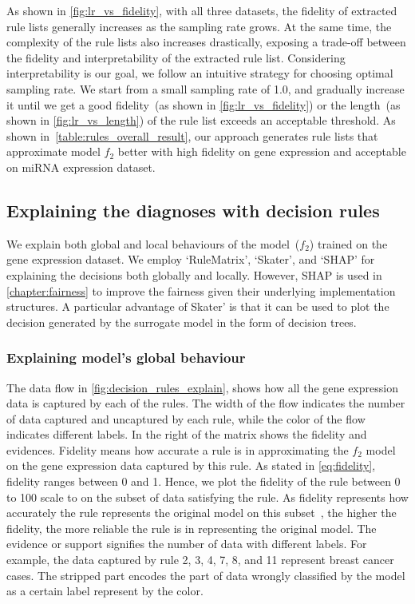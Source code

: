 \hspace*{3.5mm} As shown in \cref{fig:lr_vs_fidelity}, with all three datasets, the fidelity of extracted rule lists generally increases as the sampling rate grows. At the same time, the complexity of the rule lists also increases drastically, exposing a trade-off between the fidelity and interpretability of the extracted rule list. Considering interpretability is our goal, we follow an intuitive strategy for choosing optimal sampling rate. We  start from a small sampling rate of 1.0, and gradually increase it until we get a good fidelity~(as shown in \cref{fig:lr_vs_fidelity}) or the length~(as shown in \cref{fig:lr_vs_length}) of the rule list exceeds an acceptable threshold. As shown in~\cref{table:rules_overall_result}, our approach generates rule lists that approximate model $f_2$ better with high fidelity on gene expression and acceptable on miRNA expression dataset. 

\subsection{Explaining the diagnoses with decision rules}
We explain both global and local behaviours of the model~($f_2$) trained on the gene expression dataset. We employ `RuleMatrix', `Skater', and `SHAP' for explaining the decisions both globally and locally. However, SHAP is used in \cref{chapter:fairness} to improve the fairness given their underlying implementation structures. A particular advantage of Skater' is that it can be used to plot the decision generated by the surrogate model in the form of decision trees. 

\subsubsection{Explaining model's global behaviour}
The data flow in \cref{fig:decision_rules_explain}, shows how all the gene expression data is captured by each of the rules. The width of the flow indicates the number of data captured and uncaptured by each rule, while the color of the flow indicates different labels. In the right of the matrix shows the fidelity and evidences. Fidelity means how accurate a rule is in approximating the $f_2$ model on the gene expression data captured by this rule. 
As stated in \cref{eq:fidelity}, fidelity ranges between 0 and 1. Hence, we plot the fidelity of the rule between 0 to 100 scale to on the subset of data satisfying the rule. As fidelity represents how accurately the rule represents the original model on this subset~\cite{ming2018rulematrix}, the higher the fidelity, the more reliable the rule is in representing the original model. The evidence or support signifies the number of data with different labels. For example, the data captured by rule 2, 3, 4, 7, 8, and 11 represent breast cancer cases. The stripped part encodes the part of data wrongly classified by the model as a certain label represent by the color.

